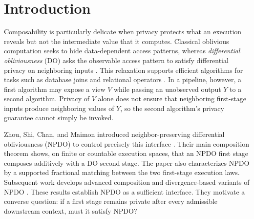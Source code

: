 \documentclass[11pt]{article}
\begin{document}
\section{Introduction}
\label{sec:introduction}

Composability is particularly delicate when privacy protects what an
execution reveals but not the intermediate value that it computes.  Classical
oblivious computation seeks to hide data-dependent access patterns, whereas
\emph{differential obliviousness} (DO) asks the observable access pattern to
satisfy differential privacy on neighboring inputs
\cite{GoldreichOstrovsky1996ORAM,DworkEtAl2006DP,ChanEtAl2022FoundationsDO}.
This relaxation supports efficient algorithms for tasks such as database joins
and relational operators \cite{ChuEtAl2021DOJoins,QinEtAl2022Adore}.  In a
pipeline, however, a first algorithm may expose a view $V$ while passing an
unobserved output $Y$ to a second algorithm.  Privacy of $V$ alone does not
ensure that neighboring first-stage inputs produce neighboring values of $Y$,
so the second algorithm's privacy guarantee cannot simply be invoked.

Zhou, Shi, Chan, and Maimon introduced neighbor-preserving differential
obliviousness (NPDO) to control precisely this interface
\cite{ZhouEtAl2023NPDO}.  Their main composition theorem shows, on finite or
countable execution spaces, that an NPDO first stage composes additively with a
DO second stage.  The paper also characterizes NPDO by a supported fractional
matching between the two first-stage execution laws.  Subsequent work develops
advanced composition and divergence-based variants of NPDO
\cite{ZhouEtAl2024AdvancedNPDO}.  These results establish NPDO as a sufficient
interface.  They motivate a converse question: if a first stage remains private
after every admissible downstream context, must it satisfy NPDO?
\end{document}

